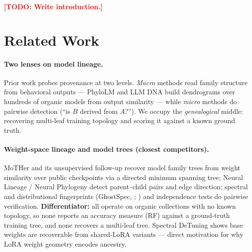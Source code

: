 \documentclass{article}
\newcommand{\TODO}[1]{\textcolor{red}{\textbf{[TODO: #1]}}}
\begin{document}
\TODO{Write introduction.}


\section{Related Work}
\label{sec:related}
%
%
%


\paragraph{Two lenses on model lineage.} Prior work probes provenance at two levels. \emph{Macro}
methods read family structure from behavioral outputs --- PhyloLM \citep{yax2025phylolm} and LLM DNA
\citep{wu2026llmdna} build dendrograms over hundreds of organic models from output similarity ---
while \emph{micro} methods do pairwise detection (``is $B$ derived from $A$?''). We occupy the
\emph{genealogical} middle: recovering multi-leaf training topology and scoring it against a known
ground truth.

\paragraph{Weight-space lineage and model trees (closest competitors).} MoTHer and its unsupervised
follow-up \citep{horwitz2024mother, horwitz2025mother} recover model family trees from weight
similarity over public checkpoints via a directed minimum spanning tree; Neural Lineage / Neural
Phylogeny \citep{yu2025neural} detect parent--child pairs and edge direction; spectral and
distributional fingerprints (GhostSpec, \citealp{ghostspec2025}; \citealp{nikolic2025provenance}) and independence tests
\citep{zhu2025independence} do pairwise verification. \textbf{Differentiator:} all operate on organic
collections with no known topology, so none reports an accuracy measure (RF) against a ground-truth
training tree, and none recovers a multi-leaf tree. Spectral DeTuning
\citep{horwitz2024spectral} shows base weights are recoverable from
shared-LoRA variants --- direct motivation for why LoRA weight geometry encodes ancestry.
\end{document}
